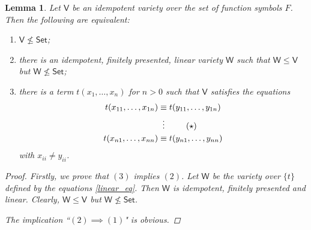 \documentclass{amsart}
\theoremstyle{plain}
\newtheorem{lemma}[theorem]{Lemma}
\theoremstyle{definition}
\theoremstyle{remark}
\begin{document}
\begin{lemma}
    \label{lemma_linear}
    Let $\mathsf{V}$ be an idempotent variety over the set of function symbols $F$. 
    Then the following are equivalent: 
    \begin{enumerate}
        \item $\mathsf{V} \nleq \mathsf{Set}$; 
        \item there is an idempotent, finitely presented, linear variety $\mathsf{W}$ such that $\mathsf{W} \le \mathsf{V}$ but $\mathsf{W} \nleq \mathsf{Set}$; 
        \item there is a term $t(x_{1}, \ldots, x_{n})$ for $n>0$ such that $\mathsf{V}$ satisfies the equations 
        \begin{align}
            \label{linear_eq}
            t(x_{11}, \ldots, x_{1n}) & \equiv t(y_{11}, \ldots, y_{1n}) \notag\\
            & \vdotswithin{\equiv} \tag{$\star$}  \\ 
            t(x_{n1}, \ldots, x_{nn}) & \equiv t(y_{n1}, \ldots, y_{nn}) \notag
        \end{align}
        with $x_{ii} \neq y_{ii}$. 
    \end{enumerate}
    \begin{proof}
        Firstly, we prove that $(3)$ implies $(2)$. 
        Let $\mathsf{W}$ be the variety over $\{t\}$ defined by the equations \eqref{linear_eq}. 
        Then $\mathsf{W}$ is idempotent, finitely presented and linear. 
        Clearly, $\mathsf{W} \le \mathsf{V}$ but $\mathsf{W} \nleq \mathsf{Set}$. 

        The implication ``$(2) \implies (1)$" is obvious. 


\end{proof}
\end{lemma}
\end{document}
